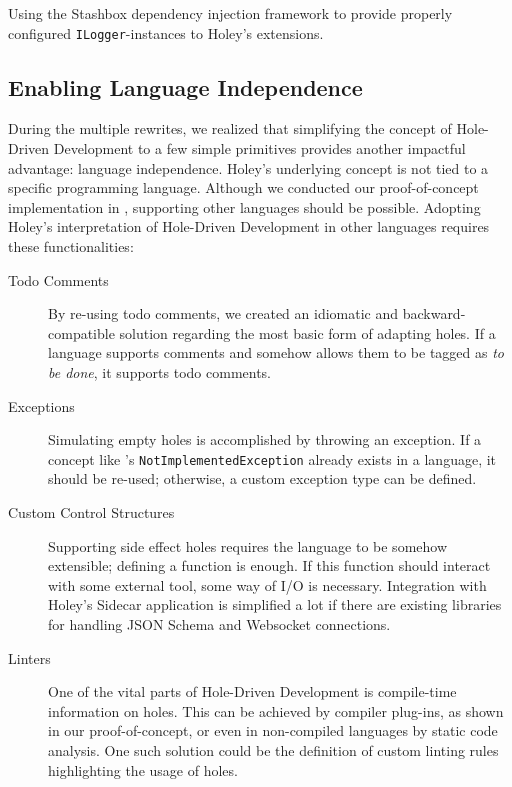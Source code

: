 \begin{program}[ht]
\caption{Using the Stashbox dependency injection framework to provide properly configured \texttt{ILogger}-instances to Holey's extensions.}
\label{prg:holey-supporting-logging}
\end{program}

\subsection{Enabling Language Independence}
\label{sec:holey-enabling-language-independence}
During the multiple rewrites, we realized that simplifying the concept of Hole-Driven Development to a few simple primitives provides another impactful advantage: language independence.
Holey's underlying concept is not tied to a specific programming language.
Although we conducted our proof-of-concept implementation in \CS, supporting other languages should be possible.
Adopting Holey's interpretation of Hole-Driven Development in other languages requires these functionalities:

\begin{description}
    \item[Todo Comments] By re-using todo comments, we created an idiomatic and backward-compatible solution regarding the most basic form of adapting holes. If a language supports comments and somehow allows them to be tagged as \emph{to be done}, it supports todo comments.
    \item[Exceptions] Simulating empty holes is accomplished by throwing an exception. If a concept like \CS's \verb|NotImplementedException| already exists in a language, it should be re-used; otherwise, a custom exception type can be defined.
    \item[Custom Control Structures] Supporting side effect holes requires the language to be somehow extensible; defining a function is enough. If this function should interact with some external tool, some way of I/O is necessary. Integration with Holey's Sidecar application is simplified a lot if there are existing libraries for handling JSON Schema and Websocket connections.
    \item[Linters] One of the vital parts of Hole-Driven Development is compile-time information on holes. This can be achieved by compiler plug-ins, as shown in our proof-of-concept, or even in non-compiled languages by static code analysis. One such solution could be the definition of custom linting rules highlighting the usage of holes.
\end{description}

